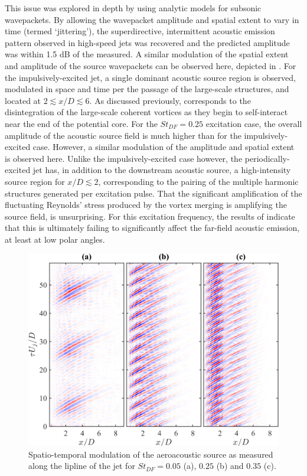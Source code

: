 This issue was explored in depth by \citet{Cavalieri2010} using analytic models for subsonic wavepackets.
By allowing the wavepacket amplitude and spatial extent to vary in time (termed `jittering'), the superdirective, intermittent acoustic emission pattern observed in high-speed jets was recovered and the predicted amplitude was within 1.5 dB of the measured.
A similar modulation of the spatial extent and amplitude of the source wavepackets can be observed here, depicted in .
For the impulsively-excited jet, a single dominant acoustic source region is observed, modulated in space and time per the passage of the large-scale structures, and located at $ 2 \lesssim x/D \lesssim 6$.
As discussed previously, corresponds to the disintegration of the large-scale coherent vortices as they begin to self-interact near the end of the potential core.
For the $St_{DF} = 0.25$ excitation case, the overall amplitude of the acoustic source field is much higher than for the impulsively-excited case.
However, a similar modulation of the amplitude and spatial extent is observed here.
Unlike the impulsively-excited case however, the periodically-excited jet has, in addition to the downstream acoustic source, a high-intensity source region  for $x/D \lesssim 2$, corresponding to the pairing of the multiple harmonic structures generated per excitation pulse.
That the significant amplification of the fluctuating Reynolds' stress produced by the vortex merging is amplifying the source field, is unsurprising.
For this excitation frequency, the results of  indicate that this is ultimately failing to significantly affect the far-field acoustic emission, at least at low polar angles.
\begin{figure}
	\centering
	\includegraphics[width=0.9\linewidth]{Figures/sect_acoustic_source_modulated_source.png}
	\caption{Spatio-temporal modulation of the aeroacoustic source as measured along the lipline of the jet for $St_{DF} = 0.05$ (a), $0.25$ (b) and $0.35$ (c).}
	\label{fig:jittering}
\end{figure}

